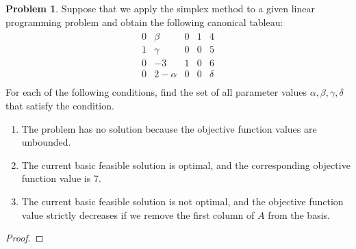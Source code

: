 \documentclass[12pt]{article}
\theoremstyle{definition}
\newtheorem{problem}{Problem}
\begin{document}
\begin{problem}
  Suppose that we apply the simplex method to a given linear programming
  problem and obtain the following canonical tableau:
  \begin{align*}
    \begin{matrix}
      0 & \beta & 0 & 1 & 4 \\
      1 & \gamma & 0 & 0 & 5 \\
      0 & -3 & 1 & 0 & 6 \\
      0 & 2 - \alpha & 0 & 0 & \delta \\
    \end{matrix}
  \end{align*}
  For each of the following conditions, find the set of all parameter values
  $\alpha, \beta, \gamma, \delta$ that satisfy the condition.
  \begin{enumerate}
    \item The problem has no solution because the objective function values are
      unbounded.
    \item The current basic feasible solution is optimal, and the corresponding
      objective function value is 7.
    \item The current basic feasible solution is not optimal, and the objective
      function value strictly decreases if we remove the first column of $A$ from
      the basis.
  \end{enumerate}
\end{problem}

\begin{proof}
\end{proof}
\end{document}
